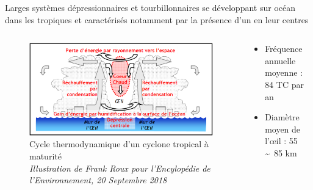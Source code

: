 \documentclass[aspectratio=169, usepdftitle=false, xcolor={dvipsnames}, 9pt]{beamer}
\begin{document}
\begin{frame}[t]
    \begin{center}
        \begin{minipage}{0.7\linewidth}
            \begin{definition}
                \footnotesize
                \centering
                Larges systèmes dépressionnaires et tourbillonnaires se développant sur océan dans les tropiques et caractérisés notamment par la présence d'un
             en leur centres
            \end{definition}
        \end{minipage}
    \end{center}
    \begin{columns}
        \begin{column}{0.5\textwidth}
            \begin{figure}[h]
                \centering
                \includegraphics[width=\textwidth]{Figures/cyclones1_fig3_Cycle-thermodynamique-cyclone.png}
                \caption{Cycle thermodynamique d'un cyclone tropical à maturité\\
                \textit{Illustration de Frank Roux pour l'Encylopédie de l'Environnement, 20 Septembre 2018}}
            \end{figure}
        \end{column}
        \begin{column}{0.5\textwidth}
           \setlength{\leftmargini}{2.5ex}
           \vspace{-2em}
           \begin{block} 
                \footnotesize
                \begin{itemize}
                    \item Fréquence annuelle moyenne : 84 TC par an \mbox{\parencite{schreck_impact_2014}}
                    \item Diamètre moyen de l'œil : 55 \sim~85 km \mbox{\parencite{weatherford_typhoon_1985}}

\end{itemize}
\end{block}
\end{column}
\end{columns}
\end{frame}
\end{document}
